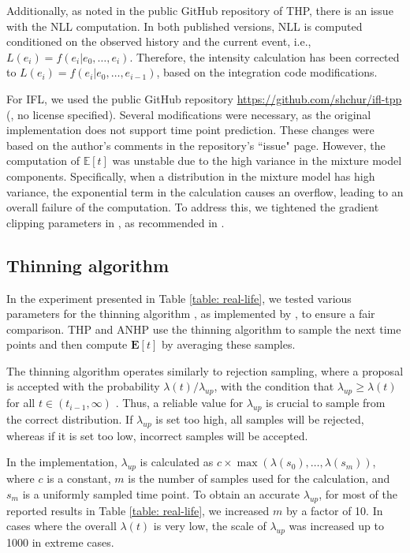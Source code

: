 Additionally, as noted in the public GitHub repository of THP, there is an issue with the NLL computation. In both published versions, NLL is computed conditioned on the observed history and the current event, i.e., $L(e_i) = f(e_i|e_0, \dots, e_i)$. Therefore, the intensity calculation has been corrected to $L(e_i) = f(e_i|e_0, \dots, e_{i-1})$, based on the integration code modifications.

For IFL, we used the public GitHub repository \href{https://github.com/shchur/ifl-tpp}{https://github.com/shchur/ifl-tpp} (\cite{bib:ifl}, no license specified). Several modifications were necessary, as the original implementation does not support time point prediction. These changes were based on the author's comments in the repository's ``issue" page. However, the computation of $\mathbb{E}[t]$ was unstable due to the high variance in the mixture model components. Specifically, when a distribution in the mixture model has high variance, the exponential term in the calculation causes an overflow, leading to an overall failure of the computation. To address this, we tightened the gradient clipping parameters in \cite{bib:ifl}, as recommended in \cite{bib:MetaTPP}.


\subsection{Thinning algorithm\label{appen: thinning}}
In the experiment presented in Table \ref{table: real-life}, we tested various parameters for the thinning algorithm \cite{lec:thinning, bib:thinning_ogata}, as implemented by \cite{bib:ANHP}, to ensure a fair comparison. 
THP and ANHP use the thinning algorithm to sample the next time points and then compute $\mathbf{E}[t]$ by averaging these samples.

The thinning algorithm operates similarly to rejection sampling, where a proposal is accepted with the probability $\lambda(t) / \lambda_{up}$, with the condition that $\lambda_{up} \geq \lambda(t)$ for all $t \in (t_{i-1}, \infty)$ \cite{bib:nhp}. 
Thus, a reliable value for $\lambda_{up}$ is crucial to sample from the correct distribution. 
If $\lambda_{up}$ is set too high, all samples will be rejected, whereas if it is set too low, incorrect samples will be accepted.

In the implementation, $\lambda_{up}$ is calculated as $c \times \max(\lambda(s_0), \dots, \lambda(s_m))$, where $c$ is a constant, $m$ is the number of samples used for the calculation, and $s_m$ is a uniformly sampled time point. 
To obtain an accurate $\lambda_{up}$, for most of the reported results in Table \ref{table: real-life}, we increased $m$ by a factor of 10. 
In cases where the overall $\lambda(t)$ is very low, the scale of $\lambda_{up}$ was increased up to 1000 in extreme cases.


